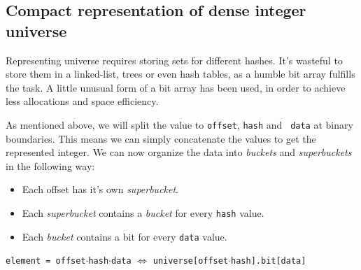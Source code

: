 \subsection{Compact representation of dense integer universe}

Representing universe requires storing sets for different hashes. It's wasteful
to store them in a linked-list, trees or even hash tables, as a humble bit array
fulfills the task. A little unusual form of a bit array has been used, in order
to achieve less allocations and space efficiency.

As mentioned above, we will split the value to {\tt offset}, {\tt hash} and {\tt
data} at binary boundaries. This means we can simply concatenate the values to
get the represented integer. We can now organize the data into {\it buckets} and
{\it superbuckets} in the following way:

\begin{itemize}
	\item Each offset has it's own {\it superbucket}.
	\item Each {\it superbucket} contains a {\it bucket} for every {\tt hash} value.
	\item Each {\it bucket} contains a bit for every {\tt data} value.
\end{itemize}

\begin{center}
	{\tt element = offset$\cdot$hash$\cdot$data} $\Leftrightarrow$
	{\tt universe[offset$\cdot$hash].bit[data]}
\end{center}

